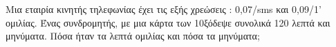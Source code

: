 Μια εταιρία κινητής τηλεφωνίας έχει τις εξής χρεώσεις : 0{,}07\officialeuro/sms και 0{,}09\officialeuro/1' ομιλίας. Ένας συνδρομητής, με μια κάρτα των 10\officialeuro\;ξόδεψε συνολικά 120 λεπτά και μηνύματα. Πόσα ήταν τα λεπτά ομιλίας και πόσα τα μηνύματα;
